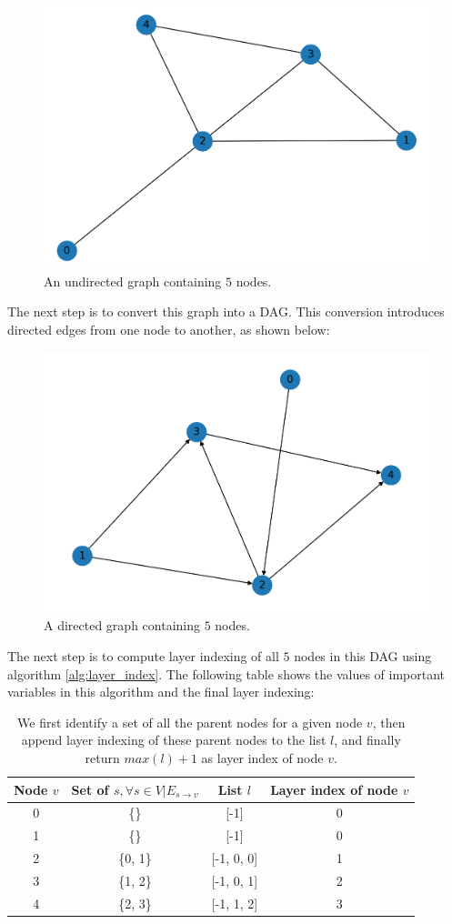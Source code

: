 \begin{figure}[h]
	\centering
	\includegraphics[width=0.45\linewidth]{images/experiments/undirected.png}
	\caption[Undirected graph containing $5$ nodes]%
	{An undirected graph containing $5$ nodes.}
	\label{fig:undirected}
\end{figure}

The next step is to convert this graph into a DAG. This conversion introduces directed edges from one node to another, as shown below:

\begin{figure}[h]
	\centering
	\includegraphics[width=0.45\linewidth]{images/experiments/directed.png}
	\caption[Directed graph containing $5$ nodes]%
	{A directed graph containing $5$ nodes.}
	\label{fig:directed}
\end{figure}

The next step is to compute layer indexing of all $5$ nodes in this DAG using algorithm \ref{alg:layer_index}. The following table shows the values of important variables in this algorithm and the final layer indexing:

\begin{table}[h]
	\centering
	\begin{tabular}{|c|c|c|c|}
	    \hline
		\textbf{Node $v$} & \textbf{Set of $s, \forall s \in V | E_{s \rightarrow v}$} & List $l$ & Layer index of node $v$\\
		\hline
		0 & \{\} & [-1] & 0\\
		1 & \{\} & [-1] & 0\\
		2 & \{0, 1\} & [-1, 0, 0] & 1\\
		3 & \{1, 2\} & [-1, 0, 1] & 2\\
		4 & \{2, 3\} & [-1, 1, 2] & 3\\
		\hline
	\end{tabular}
	\caption[Computing layer indexing of example DAG]{We first identify a set of all the parent nodes for a given node $v$, then append layer indexing of these parent nodes to the list $l$, and finally return $max(l) + 1$ as layer index of node $v$.}
	\label{tab:layer_index}
\end{table}

